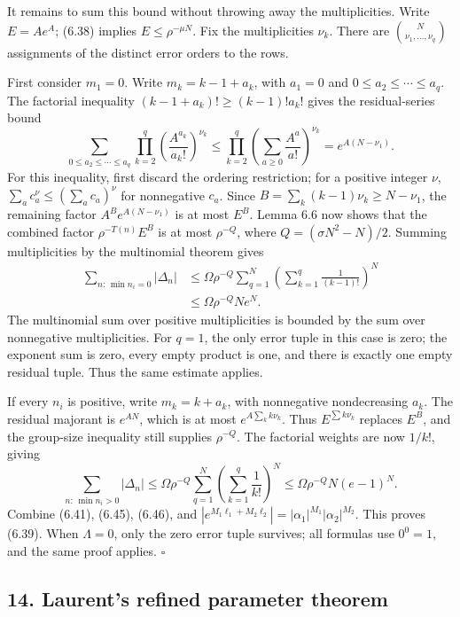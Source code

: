 \documentclass[
  11pt,
  a4paper,
]{article}
\begin{document}
It remains to sum this bound without throwing away the multiplicities.
Write \(E=Ae^A\); (6.38) implies \(E\le\rho^{-\mu N}\). Fix the
multiplicities \(\nu_k\). There are \(\binom{N}{\nu_1,\ldots,\nu_q}\)
assignments of the distinct error orders to the rows.

First consider \(m_1=0\). Write \(m_k=k-1+a_k\), with \(a_1=0\) and
\(0\le a_2\le\cdots\le a_q\). The factorial inequality
\((k-1+a_k)!\ge(k-1)!a_k!\) gives the residual-series bound \[
\sum_{0\le a_2\le\cdots\le a_q}
\prod_{k=2}^{q}\left(\frac{A^{a_k}}{a_k!}\right)^{\nu_k}
\le\prod_{k=2}^{q}\left(\sum_{a\ge0}\frac{A^a}{a!}\right)^{\nu_k}
=e^{A(N-\nu_1)}.
\tag{6.44}
\] For this inequality, first discard the ordering restriction; for a
positive integer \(\nu\), \(\sum_a c_a^\nu\le(\sum_a c_a)^\nu\) for
nonnegative \(c_a\). Since \(B=\sum_k(k-1)\nu_k\ge N-\nu_1\), the
remaining factor \(A^B e^{A(N-\nu_1)}\) is at most \(E^B\). Lemma 6.6
now shows that the combined factor \(\rho^{-T(n)}E^B\) is at most
\(\rho^{-Q}\), where \(Q=(\sigma N^2-N)/2\). Summing multiplicities by
the multinomial theorem gives \[
\begin{aligned}
\sum_{n:\,\min n_i=0}|\Delta_n|
&\le\Omega\rho^{-Q}\sum_{q=1}^{N}
\left(\sum_{k=1}^{q}\frac1{(k-1)!}\right)^N\\
&\le\Omega\rho^{-Q}N e^N.
\end{aligned}
\tag{6.45}
\] The multinomial sum over positive multiplicities is bounded by the
sum over nonnegative multiplicities. For \(q=1\), the only error tuple
in this case is zero; the exponent sum is zero, every empty product is
one, and there is exactly one empty residual tuple. Thus the same
estimate applies.

If every \(n_i\) is positive, write \(m_k=k+a_k\), with nonnegative
nondecreasing \(a_k\). The residual majorant is \(e^{AN}\), which is at
most \(e^{A\sum_k k\nu_k}\). Thus \(E^{\sum k\nu_k}\) replaces \(E^B\),
and the group-size inequality still supplies \(\rho^{-Q}\). The
factorial weights are now \(1/k!\), giving \[
\sum_{n:\,\min n_i>0}|\Delta_n|
\le\Omega\rho^{-Q}\sum_{q=1}^{N}
\left(\sum_{k=1}^{q}\frac1{k!}\right)^N
\le\Omega\rho^{-Q}N(e-1)^N.
\tag{6.46}
\] Combine (6.41), (6.45), (6.46), and
\(|e^{M_1\ell_1+M_2\ell_2}|=|\alpha_1|^{M_1}|\alpha_2|^{M_2}\). This
proves (6.39). When \(\Lambda=0\), only the zero error tuple survives;
all formulas use \(0^0=1\), and the same proof applies. \(\square\)

\subsection{14. Laurent's refined parameter
theorem}\label{laurents-refined-parameter-theorem}
\end{document}
